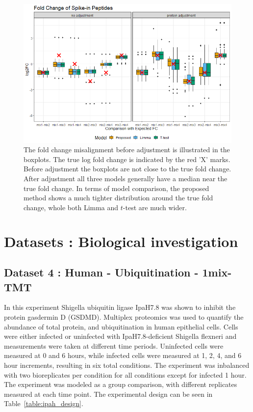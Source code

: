 \documentclass{mcp}
\begin{document}
\begin{figure}[h!]
\centering
\includegraphics[width=.85\textwidth]{sim_new/spike_in_fc}
\caption{The fold change misalignment before adjustment is illustrated in the boxplots. The true log fold change is indicated by the red 'X' marks. Before adjustment the boxplots are not close to the true fold change. After adjustment all three models generally have a median near the true fold change. In terms of model comparison, the proposed method shows a much tighter distribution around the true fold change, whole both Limma and $t$-test are much wider. \label{fig:spike_fc}}
\end{figure}


\clearpage
\section{Datasets : Biological investigation}
\label{sec:bio_investigations}

\subsection{Dataset 4 : Human - Ubiquitination - 1mix-TMT}
\label{sec:ipah}

In this experiment Shigella ubiquitin ligase IpaH7.8 was shown to inhibit the protein gasdermin D (GSDMD). \cite{LUCHETTI2021} Multiplex proteomics was used to quantify the abundance of total protein, and ubiquitination in human epithelial cells. Cells were either infected or uninfected with IpaH7.8-deficient Shigella flexneri and measurements were taken at different time periods. Uninfected cells were measured at 0 and 6 hours, while infected cells were measured at 1, 2, 4, and 6 hour increments, resulting in six total conditions. The experiment was inbalanced with two bioreplicates per condition for all conditions except for infected 1 hour. The experiment was modeled as a group comparison, with different replicates measured at each time point. The experimental design can be seen in Table~\ref{table:ipah_design}.
\end{document}
